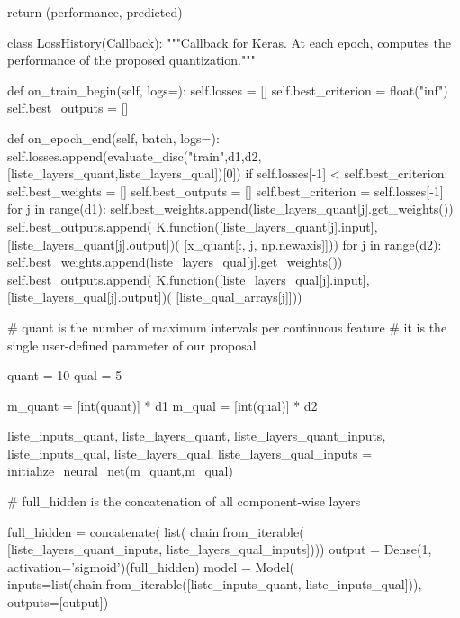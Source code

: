 \begin{pylisting}
        return (performance, predicted)


    
    class LossHistory(Callback):
        """Callback for Keras. At each epoch, computes the performance of the proposed quantization."""

        def on_train_begin(self, logs={}):
            self.losses = []
            self.best_criterion = float("inf")
            self.best_outputs = []

        def on_epoch_end(self, batch, logs={}):
            self.losses.append(evaluate_disc("train",d1,d2,[liste_layers_quant,liste_layers_qual])[0])
            if self.losses[-1] < self.best_criterion:
                self.best_weights = []
                self.best_outputs = []
                self.best_criterion = self.losses[-1]
                for j in range(d1):
                    self.best_weights.append(liste_layers_quant[j].get_weights())
                    self.best_outputs.append(
                        K.function([liste_layers_quant[j].input],
                                   [liste_layers_quant[j].output])(
                                       [x_quant[:, j, np.newaxis]]))
                for j in range(d2):
                    self.best_weights.append(liste_layers_qual[j].get_weights())
                    self.best_outputs.append(
                        K.function([liste_layers_qual[j].input],
                                   [liste_layers_qual[j].output])(
                                       [liste_qual_arrays[j]]))
    
    
	# quant is the number of maximum intervals per continuous feature
	# it is the single user-defined parameter of our proposal    
    
    quant = 10
    qual = 5

    m_quant = [int(quant)] * d1
    m_qual = [int(qual)] * d2

	liste_inputs_quant, liste_layers_quant, liste_layers_quant_inputs, liste_inputs_qual, liste_layers_qual, liste_layers_qual_inputs = initialize_neural_net(m_quant,m_qual)

	# full_hidden is the concatenation of all component-wise layers
	
    full_hidden = concatenate(
        list(
          chain.from_iterable(
              [liste_layers_quant_inputs, liste_layers_qual_inputs])))
    output = Dense(1, activation='sigmoid')(full_hidden)
    model = Model(
      inputs=list(chain.from_iterable([liste_inputs_quant, liste_inputs_qual])),
      outputs=[output])  


\end{pylisting}
